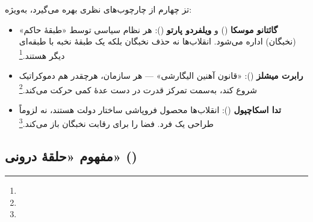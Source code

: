 تز چهارم از چارچوب‌های نظری  بهره می‌گیرد، به‌ویژه:

\begin{itemize}[label=\textcolor{cConsolid}{$\bullet$}, rightmargin=2em]
    \item \textbf{گائتانو موسکا} () و \textbf{ویلفردو پارتو} (): هر نظام سیاسی توسط «طبقهٔ حاکم» (نخبگان) اداره می‌شود. انقلاب‌ها نه حذف نخبگان بلکه  یک طبقهٔ نخبه با طبقه‌ای دیگر هستند.\footnote{}
    
    \item \textbf{رابرت میشلز} (): «قانون آهنین الیگارشی» — هر سازمان، هرچقدر هم دموکراتیک شروع کند، به‌سمت تمرکز قدرت در دست عدهٔ کمی حرکت می‌کند.\footnote{}
    
    \item \textbf{تدا اسکاچپول} (): انقلاب‌ها محصول فروپاشی ساختار دولت هستند، نه لزوماً طراحی یک فرد.  فضا را برای رقابت نخبگان باز می‌کند.\footnote{}
\end{itemize}

\subsection{مفهوم «حلقهٔ درونی» ()}


